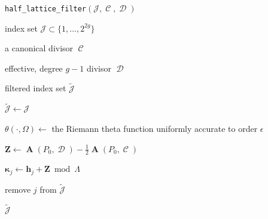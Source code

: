 \documentclass[12pt]{article}
\theoremstyle{definition}
\DeclareMathOperator{\DivC}{\mathcal{C}}
\DeclareMathOperator{\DivD}{\mathcal{D}}
\DeclareMathOperator{\Abel}{\boldsymbol{A}}
\begin{document}
\begin{algorithm}[t]
\caption{{\tt half\_lattice\_filter}$(\mathcal{J},\DivC,\DivD)$}
\label{alg:half-lattice-filter}
\begin{algorithmic}[1]

  \Require index set $\mathcal{J} \subset \{1, \ldots, 2^{2g}\}$

  \Require a canonical divisor $\DivC$

  \Require effective, degree $g-1$ divisor $\DivD$

  \Ensure filtered index set $\tilde{\mathcal{J}}$

  \State $\tilde{\mathcal{J}} \gets \mathcal{J}$

  \State $\theta( \cdot, \Omega) \gets$ the Riemann theta function
  uniformly accurate to order $\epsilon$

  \State $\boldsymbol{Z} \gets \Abel(P_0,\DivD) - \tfrac{1}{2}
  \Abel(P_0,\DivC)$


      \State $\boldsymbol{\kappa}_j \gets \boldsymbol{h}_j + \boldsymbol{Z}
      \bmod{\Lambda}$


          \State remove $j$ from $\tilde{\mathcal{J}}$

      \EndIf

  \EndFor

  \State \Return $\tilde{\mathcal{J}}$

\end{algorithmic}
\end{algorithm}
\end{document}
